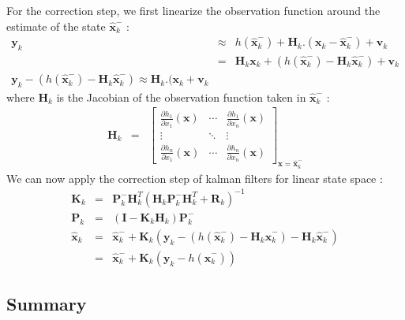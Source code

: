 \documentclass[10pt,oneside]{scrartcl}
\newcommand\vecteur[1]{\boldsymbol#1}
\newcommand\matrice[1]{\mathbf#1}
\begin{document}
For the correction step, we first linearize the observation function
around the estimate of the state $\hat{\vecteur{x}}_k^-$ :
\begin{eqnarray}
\label{eq_ekf_linear_observation} \vecteur{y_{k}} &\approx&
h(\hat{\vecteur{x}}_k^-) + \matrice{H}_k .(\vecteur{x_{k}} -
\hat{\vecteur{x}}_k^-) + \vecteur{v_k}\\
&=& \matrice{H}_k \vecteur{x}_k + (h(\hat{\vecteur{x}}_k^-)-
\matrice{H}_k \hat{\vecteur{x}}_k^-) + \vecteur{v}_k\\
\vecteur{y_{k}} - (h(\hat{\vecteur{x}}_k^-)-
\matrice{H}_k \hat{\vecteur{x}}_k^-) \approx  \matrice{H}_k
.(\vecteur{x_{k}} + \vecteur{v}_k
\end{eqnarray}
where $\matrice{H}_k$ is the Jacobian of the observation function
taken in $\hat{\vecteur{x}}_k^-$ :
\begin{eqnarray}
\matrice{H}_{k} &=& \begin{bmatrix}
\frac{\partial h_1}{\partial x_1}(\vecteur{x}) & \cdots & \frac{\partial h_1}{\partial x_n}(\vecteur{x})\\
\vdots & \ddots & \vdots\\
\frac{\partial h_n}{\partial x_1}(\vecteur{x}) & \cdots & \frac{\partial h_n}{\partial x_n}(\vecteur{x})
\end{bmatrix}_{\vecteur{x} = \hat{\vecteur{x}}_k^-}
\end{eqnarray}
We can now apply the correction step of kalman filters for linear
state space :
\begin{eqnarray}
\matrice{K}_k &=& \matrice{P}_k^- \matrice{H}_k^T (\matrice{H}_k
\matrice{P}_k^- \matrice{H}_k^T + \matrice{R}_k)^{-1} \\
\matrice{P}_k &=& (\matrice{I} - \matrice{K}_k \matrice{H}_k)
\matrice{P}_k^- \\
\nonumber \hat{\vecteur{x}}_k &=& \hat{\vecteur{x}}_k^- + \matrice{K}_k
(\vecteur{y_{k}} - (h(\hat{\vecteur{x}}_k^-)- \matrice{H}_k
\hat{\vecteur{x}}_k^-) - \matrice{H}_k \hat{\vecteur{x}}_k^-)\\
&=&  \hat{\vecteur{x}}_k^- + \matrice{K}_k (\vecteur{y_{k}} - h(\hat{\vecteur{x}}_k^-))
\end{eqnarray}

\subsection{Summary}
\end{document}

